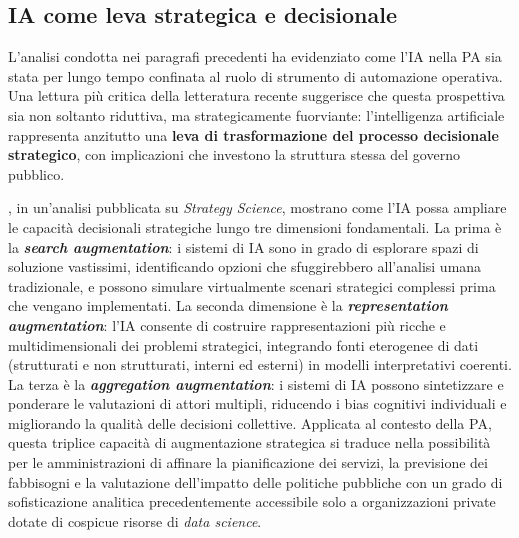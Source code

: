 
\subsection{IA come leva strategica e decisionale}
\label{subsec:ia-leva-strategica}

L'analisi condotta nei paragrafi precedenti ha evidenziato come l'IA nella PA sia stata per lungo tempo confinata al ruolo di strumento di automazione operativa. Una lettura più critica della letteratura recente suggerisce che questa prospettiva sia non soltanto riduttiva, ma strategicamente fuorviante: l'intelligenza artificiale rappresenta anzitutto una \textbf{leva di trasformazione del processo decisionale strategico}, con implicazioni che investono la struttura stessa del governo pubblico.

\textcite{ShresthaAISDM2024}, in un'analisi pubblicata su \textit{Strategy Science}, mostrano come l'IA possa ampliare le capacità decisionali strategiche lungo tre dimensioni fondamentali. La prima è la \textbf{\textit{search augmentation}}: i sistemi di IA sono in grado di esplorare spazi di soluzione vastissimi, identificando opzioni che sfuggirebbero all'analisi umana tradizionale, e possono simulare virtualmente scenari strategici complessi prima che vengano implementati. La seconda dimensione è la \textbf{\textit{representation augmentation}}: l'IA consente di costruire rappresentazioni più ricche e multidimensionali dei problemi strategici, integrando fonti eterogenee di dati (strutturati e non strutturati, interni ed esterni) in modelli interpretativi coerenti. La terza è la \textbf{\textit{aggregation augmentation}}: i sistemi di IA possono sintetizzare e ponderare le valutazioni di attori multipli, riducendo i bias cognitivi individuali e migliorando la qualità delle decisioni collettive. Applicata al contesto della PA, questa triplice capacità di augmentazione strategica si traduce nella possibilità per le amministrazioni di affinare la pianificazione dei servizi, la previsione dei fabbisogni e la valutazione dell'impatto delle politiche pubbliche con un grado di sofisticazione analitica precedentemente accessibile solo a organizzazioni private dotate di cospicue risorse di \textit{data science}.

